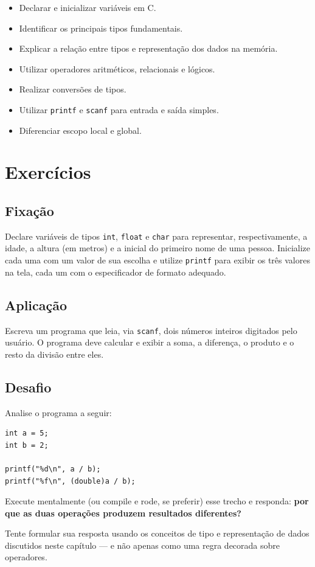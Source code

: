 \documentclass[12pt,a4paper,oneside]{extreport}
\begin{document}
\begin{objetivos}
\begin{itemize}
    \item Declarar e inicializar variáveis em C.
    \item Identificar os principais tipos fundamentais.
    \item Explicar a relação entre tipos e representação dos dados na memória.
    \item Utilizar operadores aritméticos, relacionais e lógicos.
    \item Realizar conversões de tipos.
    \item Utilizar \texttt{printf} e \texttt{scanf} para entrada e saída simples.
    \item Diferenciar escopo local e global.
\end{itemize}
\end{objetivos}

\section*{Exercícios}

\begin{exercicio}

\subsection*{Fixação}
Declare variáveis de tipos \texttt{int}, \texttt{float} e \texttt{char} para representar, respectivamente, a idade, a altura (em metros) e a inicial do primeiro nome de uma pessoa. Inicialize cada uma com um valor de sua escolha e utilize \texttt{printf} para exibir os três valores na tela, cada um com o especificador de formato adequado.


\subsection*{Aplicação}
Escreva um programa que leia, via \texttt{scanf}, dois números inteiros digitados pelo usuário. O programa deve calcular e exibir a soma, a diferença, o produto e o resto da divisão entre eles.


\subsection*{Desafio}
Analise o programa a seguir:

\begin{lstlisting}
int a = 5;
int b = 2;

printf("%d\n", a / b);
printf("%f\n", (double)a / b);
\end{lstlisting}

Execute mentalmente (ou compile e rode, se preferir) esse trecho e responda: \textbf{por que as duas operações produzem resultados diferentes?}

Tente formular sua resposta usando os conceitos de tipo e representação de dados discutidos neste capítulo — e não apenas como uma regra decorada sobre operadores.


\end{exercicio}
\end{document}
